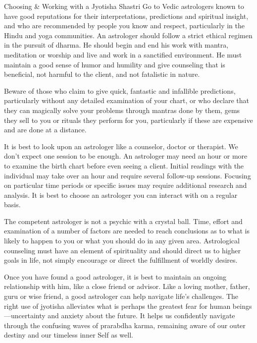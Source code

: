 Choosing & Working with a Jyotisha Shastri
Go to Vedic astrologers known to have good reputations for their interpretations, predictions and spiritual insight, and who are recommended by people you know and respect, particularly in the Hindu and yoga communities. An astrologer should follow a strict ethical regimen in the pursuit of dharma. He should begin and end his work with mantra, meditation or worship and live and work in a sanctified environment. He must maintain a good sense of humor and humility and give counseling that is beneficial, not harmful to the client, and not fatalistic in nature.

 

Beware of those who claim to give quick, fantastic and infallible predictions, particularly without any detailed examination of your chart, or who declare that they can magically solve your problems through mantras done by them, gems they sell to you or rituals they perform for you, particularly if these are expensive and are done at a distance.

 

It is best to look upon an astrologer like a counselor, doctor or therapist. We don’t expect one session to be enough. An astrologer may need an hour or more to examine the birth chart before even seeing a client. Initial readings with the individual may take over an hour and require several follow-up sessions. Focusing on particular time periods or specific issues may require additional research and analysis. It is best to choose an astrologer you can interact with on a regular basis.

 

The competent astrologer is not a psychic with a crystal ball. Time, effort and examination of a number of factors are needed to reach conclusions as to what is likely to happen to you or what you should do in any given area. Astrological counseling must have an element of spirituality and should direct us to higher goals in life, not simply encourage or direct the fulfillment of worldly desires.

 

Once you have found a good astrologer, it is best to maintain an ongoing relationship with him, like a close friend or advisor. Like a loving mother, father, guru or wise friend, a good astrologer can help navigate life’s challenges. The right use of jyotisha alleviates what is perhaps the greatest fear for human beings—uncertainty and anxiety about the future. It helps us confidently navigate through the confusing waves of ­prarabdha karma, remaining aware of our outer destiny and our timeless inner Self as well.

